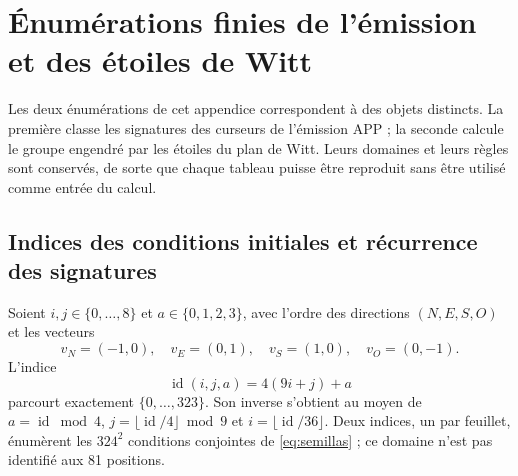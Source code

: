 \section{Énumérations finies de l’émission et des étoiles de Witt}
\label{iv:apendice-enumeraciones}

Les deux énumérations de cet appendice correspondent à des objets distincts.
La première classe les signatures des curseurs de l’émission APP ;
la seconde calcule le groupe engendré par les étoiles du plan de Witt.
Leurs domaines et leurs règles sont conservés, de sorte que chaque tableau puisse
être reproduit sans être utilisé comme entrée du calcul.

\subsection{Indices des conditions initiales et récurrence des signatures}
\label{iv:apendice-firmas}

Soient \(i,j\in\{0,\ldots,8\}\) et \(a\in\{0,1,2,3\}\), avec l’ordre
des directions \((N,E,S,O)\) et les vecteurs
\[
 v_N=(-1,0),\quad v_E=(0,1),\quad
 v_S=(1,0),\quad v_O=(0,-1).
\]
L’indice
\[
 \operatorname{id}(i,j,a)=4(9i+j)+a
\]
parcourt exactement \(\{0,\ldots,323\}\). Son inverse s’obtient
au moyen de \(a=\operatorname{id}\bmod4\),
\(j=\lfloor\operatorname{id}/4\rfloor\bmod9\) et
\(i=\lfloor\operatorname{id}/36\rfloor\).
Deux indices, un par feuillet, énumèrent les \(324^2\) conditions conjointes
de \eqref{eq:semillas} ; ce domaine n’est pas identifié aux 81 positions.

